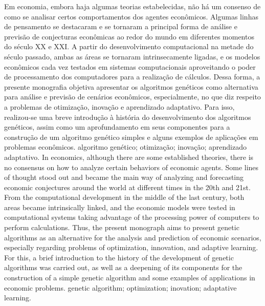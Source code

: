 \documentclass[a4paper,12pt,openright,oneside]{book}
\begin{document}
\resumo
{Em economia, embora haja algumas teorias estabelecidas, não há um consenso de como se analisar certos comportamentos dos agentes econômicos. Algumas linhas de pensamento se destacaram e se tornaram a principal forma de análise e previsão de conjecturas econômicas ao redor do mundo em diferentes momentos do século XX e XXI. A partir do desenvolvimento computacional na metade do século passado, ambas as áreas se tornaram intrinsecamente ligadas, e os modelos econômicos cada vez testados em sistemas computacionais aproveitando o poder de processamento dos computadores para a realização de cálculos. Dessa forma, a presente monografia objetiva apresentar os algoritmos genéticos como alternativa para análise e previsão de cenários econômicos, especialmente, no que diz respeito a problemas de otimização, inovação e aprendizado adaptativo. Para isso, realizou-se uma breve introdução à história do desenvolvimento dos algoritmos genéticos, assim como um aprofundamento em seus componentes para a construção de um algoritmo genético simples e alguns exemplos de aplicações em problemas econômicos.}
{algoritmo genético; otimização; inovação; aprendizado adaptativo.}
{In economics, although there are some established theories, there is no consensus on how to analyze certain behaviors of economic agents. Some lines of thought stood out and became the main way of analyzing and forecasting economic conjectures around the world at different times in the 20th and 21st. From the computational development in the middle of the last century, both areas became intrinsically linked, and the economic models were tested in computational systems taking advantage of the processing power of computers to perform calculations. Thus, the present monograph aims to present genetic algorithms as an alternative for the analysis and prediction of economic scenarios, especially regarding problems of optimization, innovation, and adaptive learning. For this, a brief introduction to the history of the development of genetic algorithms was carried out, as well as a deepening of its components for the construction of a simple genetic algorithm and some examples of applications in economic problems.}
{genetic algorithm; optimization; inovation; adaptative learning.}

\listafiguras
 
\end{document}
